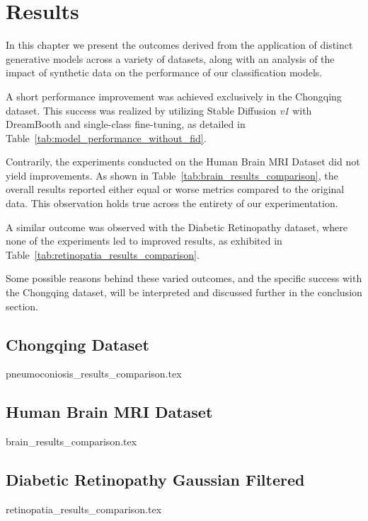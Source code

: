 \chapter{Results}

In this chapter we present the outcomes derived from the application of distinct generative models across a variety of datasets, along with an analysis of the impact of synthetic data on the performance of our classification models.

A short performance improvement was achieved exclusively in the Chongqing dataset. This success was realized by utilizing Stable Diffusion \textit{v1} with DreamBooth and single-class fine-tuning, as detailed in Table~\ref{tab:model_performance_without_fid}. 

Contrarily, the experiments conducted on the Human Brain MRI Dataset did not yield improvements. As shown in Table~\ref{tab:brain_results_comparison}, the overall results reported either equal or worse metrics compared to the original data. This observation holds true across the entirety of our experimentation.

A similar outcome was observed with the Diabetic Retinopathy dataset, where none of the experiments led to improved results, as exhibited in Table~\ref{tab:retinopatia_results_comparison}.

Some possible reasons behind these varied outcomes, and the specific success with the Chongqing dataset, will be interpreted and discussed further in the conclusion section.

\section{Chongqing Dataset}

{pneumoconiosis_results_comparison.tex}

\section{Human Brain MRI Dataset}

{brain_results_comparison.tex}

\section{Diabetic Retinopathy Gaussian Filtered}

{retinopatia_results_comparison.tex}

